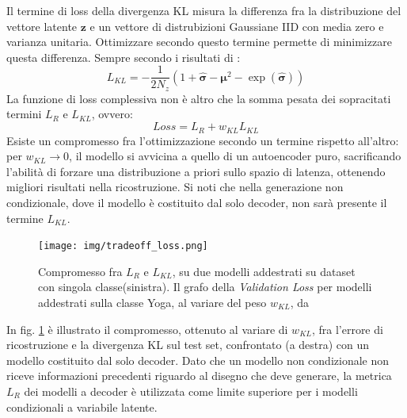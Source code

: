 Il termine di loss della divergenza KL misura la differenza fra la distribuzione del vettore latente $\boldsymbol{z}$ e un vettore di distrubizioni Gaussiane IID con media zero e varianza unitaria. Ottimizzare secondo questo termine permette di minimizzare questa differenza. Sempre secondo i risultati di \cite{VAE}:
\begin{equation}
	\label{KL}
	L_{KL} = - \frac{1}{2N_z}(1 + \boldsymbol{\hat\sigma} - \boldsymbol{\mu}^2 - \exp(\boldsymbol{\hat\sigma}))
\end{equation}
La funzione di loss complessiva non è altro che la somma pesata dei sopracitati termini $L_R$ e $L_{KL}$, ovvero:
\begin{equation}
	\label{loss}
	Loss = L_R + w_{KL}L_{KL}
\end{equation}
Esiste un compromesso fra l'ottimizzazione secondo un termine rispetto all'altro: per $w_{KL} \rightarrow 0$, il modello si avvicina a quello di un autoencoder puro, sacrificando l'abilità di forzare una distribuzione a priori sullo spazio di latenza, ottenendo migliori risultati nella ricostruzione. Si noti che nella generazione non condizionale, dove il modello è costituito dal solo decoder, non sarà presente il termine $L_{KL}$.
\begin{figure}
	\centering
	\texttt{[image: img/tradeoff\_loss.png]}
	\caption{Compromesso fra $L_R$ e $L_{KL}$, su due modelli addestrati su dataset con singola classe(sinistra). Il grafo della \textit{Validation Loss} per modelli addestrati sulla classe Yoga, al variare del peso $w_{KL}$, da \cite{sketchrnn}}
	\label{fig:1.19}
\end{figure}
In fig. \ref{fig:1.19} è illustrato il compromesso, ottenuto al variare di $w_{KL}$, fra l'errore di ricostruzione e la divergenza KL sul test set, confrontato (a destra) con un modello costituito dal solo decoder. Dato che un modello non condizionale non riceve informazioni precedenti riguardo al disegno che deve generare, la metrica $L_R$ dei modelli a decoder è utilizzata come limite superiore per i modelli condizionali a variabile latente.
